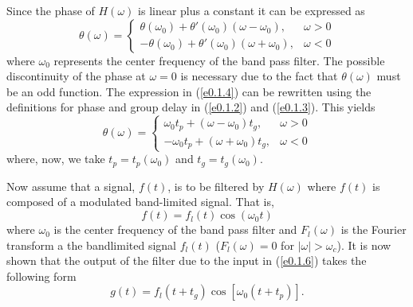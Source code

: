 	Since the phase of $H(\omega)$ is linear plus
a constant it can be expressed as
%
\begin{equation}
\theta(\omega)=\left\{\begin{array}{ll}
 \theta(\omega_0)+\theta'(\omega_0)(\omega-\omega_0),&\mbox{$\omega>0$}\\
 -\theta(\omega_0)+\theta'(\omega_0)(\omega+\omega_0),&\mbox{$\omega<0$}
\end{array}\right.
\label{e0.1.4}
\end{equation}
%
where $\omega_0$ represents the center frequency of the band pass
filter.  The possible discontinuity of the phase at
$\omega=0$ is necessary due to the fact that $\theta(\omega)$ must be an
odd function.  The expression in (\ref{e0.1.4}) can be rewritten
using the definitions for phase and group delay in (\ref{e0.1.2})
and (\ref{e0.1.3}).  This yields
%
\begin{equation}
\theta(\omega)=\left\{\begin{array}{ll}
 \omega_0t_p+(\omega-\omega_0)t_g,&\mbox{$\omega>0$}\\
 -\omega_0t_p+(\omega+\omega_0)t_g,&\mbox{$\omega<0$}
\end{array}\right.
\label{e0.1.5}
\end{equation}
%
where, now, we take $t_p=t_p(\omega_0)$ and $t_g=t_g(\omega_0)$.

	Now assume that a signal, $f(t)$, is to 
be filtered by $H(\omega)$ where $f(t)$ is composed
of a modulated band-limited signal.  That is,
%
\begin{equation}
f(t)=f_l(t)\cos(\omega_0t)
\label{e0.1.6}
\end{equation}
%
where $\omega_0$ is the center frequency of the
band pass filter and $F_l(\omega)$ is the Fourier transform
a the bandlimited signal $f_l(t)$
($F_l(\omega)=0$ for $|\omega|>\omega_c$).  It is now
shown that the output of the filter due to the input in 
(\ref{e0.1.6}) takes the following form
%
\begin{equation}
g(t)=f_l(t+t_g)\cos[\omega_0(t+t_p)].
\label{e0.1.7}
\end{equation}
%

